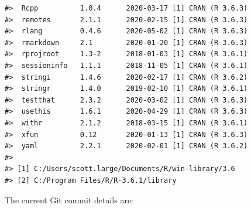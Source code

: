 \documentclass[
]{article}
\begin{document}
\begin{verbatim}
#>  Rcpp          1.0.4      2020-03-17 [1] CRAN (R 3.6.3)                 
#>  remotes       2.1.1      2020-02-15 [1] CRAN (R 3.6.3)                 
#>  rlang         0.4.6      2020-05-02 [1] CRAN (R 3.6.3)                 
#>  rmarkdown     2.1        2020-01-20 [1] CRAN (R 3.6.3)                 
#>  rprojroot     1.3-2      2018-01-03 [1] CRAN (R 3.6.1)                 
#>  sessioninfo   1.1.1      2018-11-05 [1] CRAN (R 3.6.1)                 
#>  stringi       1.4.6      2020-02-17 [1] CRAN (R 3.6.2)                 
#>  stringr       1.4.0      2019-02-10 [1] CRAN (R 3.6.1)                 
#>  testthat      2.3.2      2020-03-02 [1] CRAN (R 3.6.3)                 
#>  usethis       1.6.1      2020-04-29 [1] CRAN (R 3.6.3)                 
#>  withr         2.1.2      2018-03-15 [1] CRAN (R 3.6.1)                 
#>  xfun          0.12       2020-01-13 [1] CRAN (R 3.6.3)                 
#>  yaml          2.2.1      2020-02-01 [1] CRAN (R 3.6.2)                 
#> 
#> [1] C:/Users/scott.large/Documents/R/win-library/3.6
#> [2] C:/Program Files/R/R-3.6.1/library
\end{verbatim}

The current Git commit details are:
\end{document}
